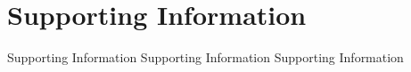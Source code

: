 \documentclass[a4paper,10pt,twocolumn]{article}
\begin{document}
\onecolumn 

\newpage
\section*{Supporting Information} 
\setcounter{figure}{0}
\renewcommand{\thefigure}{S\arabic{figure}}
\setcounter{table}{0}
\renewcommand{\thetable}{S\arabic{table}}
\setcounter{page}{1}
\renewcommand{\thepage}{S\arabic{page}}

Supporting Information Supporting Information Supporting Information
\end{document}
